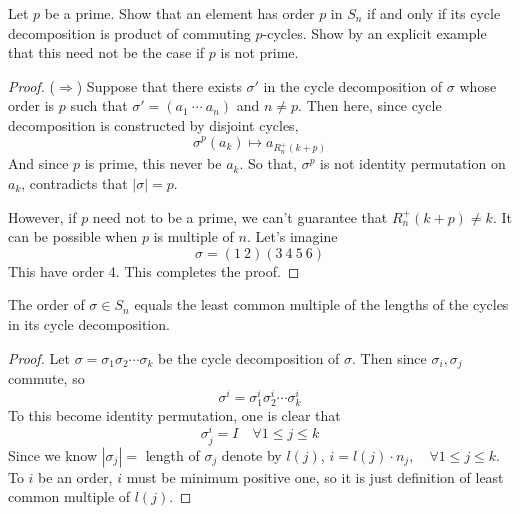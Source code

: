 \documentclass[12pt, a4paper, openany, twoside]{book}
\theoremstyle{definition}
\theoremstyle{remark}
\theoremstyle{plain}
\numberwithin{equation}{section}
\begin{document}
\begin{tcolorbox}[colback=yellow!10!white,colframe=violet!75!white,title=Exercise 14]

Let $p$ be a prime. Show that an element has order $p$ in $S_n$ if and only if its cycle decomposition is product of 
commuting $p$-cycles. Show by an explicit example that this need not be the case if $p$ is not prime. 

\begin{proof}
    
($\Rightarrow$) Suppose that there exists $\sigma'$ in the cycle decomposition of $\sigma$ whose order is $p$ such that 
$\sigma' = (a_1~\cdots~a_n)$ and $n \neq p$. Then here, since cycle decomposition is constructed by disjoint cycles, 
\[\sigma^p(a_k) \mapsto a_{R^+_n(k + p)}\]
And since $p$ is prime, this never be $a_k$. So that, $\sigma^p$ is not identity permutation on $a_k$, contradicts that $|\sigma| = p$. 

However, if $p$ need not to be a prime, we can't guarantee that $R^+_n(k + p) \neq k$. It can be possible when $p$ is multiple of $n$. Let's imagine 
\[\sigma = (1~2)(3~4~5~6)\]
This have order 4. This completes the proof.

\end{proof}

\end{tcolorbox}

\begin{tcolorbox}[colback=yellow!10!white,colframe=red!75!black,title=Proposition 1.3.1.,breakable]

The order of $\sigma \in S_n$ equals the least common multiple of the lengths of the cycles in its cycle decomposition.

\begin{proof}
    
Let $\sigma = \sigma_1 \sigma_2 \cdots \sigma_k$ be the cycle decomposition of $\sigma$. Then since $\sigma_i, \sigma_j$ commute, so 
\[\sigma^i = \sigma_1^i \sigma_2^i \cdots \sigma_k^i\]
To this become identity permutation, one is clear that 
\[\sigma_j^i = I \quad \forall 1 \leq j \leq k \]
Since we know $|\sigma_j| = $ length of $\sigma_j$ denote by $l(j)$, 
$i = l(j) \cdot n_j , \quad \forall 1 \leq j \leq k$. 
To $i$ be an order, $i$ must be minimum positive one, so it is just definition of least common multiple of $l(j)$. 

\end{proof}

\end{tcolorbox}
\end{document}
